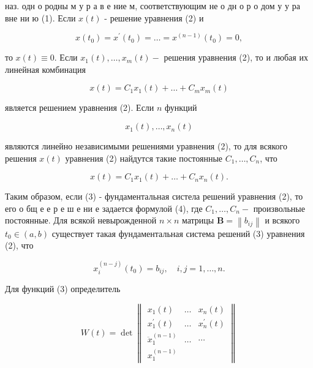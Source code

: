 \documentclass[10pt]{article}
\begin{document}
наз. одн о родны м у р а в е ние м, соответствующим не о дн о р о дом у у ра вне ни ю (1). Если $x(t)$ - решение уравнения (2) и



\[

x\left(t_{0}\right)=x^{\prime}\left(t_{0}\right)=\ldots=x^{(n-1)}\left(t_{0}\right)=0,

\]



то $x(t) \equiv 0$. Если $x_{1}(t), \ldots, x_{m}(t)-$ решения уравнения (2), то и любая их линейная комбинация



\[

x(t)=C_{1} x_{1}(t)+\ldots+C_{m} x_{m}(t)

\]



является решением уравнения (2). Если $n$ функций



\[

x_{1}(t), \ldots, x_{n}(t)

\]



являются линейно независимыми решениями уравнения (2), то для всякого решения $x(t)$ уравнения (2) найдутся такие постоянные $C_{1}, \ldots, C_{n}$, что



\[

x(t)=C_{1} x_{1}(t)+\ldots+C_{n} x_{n}(t) .

\]



Таким образом, если (3) - фундаментальная систела решений уравнения (2), то его о бщ е е р е ш е ни е задается формулой (4), где $C_{1}, \ldots, C_{n}-$ произвольные постоянные. Для всякой невырожденной $n \times n$ матрицы $\boldsymbol{B}=\left\|b_{i j}\right\|$ и всякого $t_{0} \in(a, b)$ существует такая фундаментальная система решений (3) уравнения (2), что



\[

x_{i}^{(n-j)}\left(t_{0}\right)=b_{i j}, \quad i, j=1, \ldots, n .

\]



Для функций (3) определитель



\[

W(t)=\operatorname{det}\left\|\begin{array}{lll}

x_{1}(t) & \ldots & x_{n}(t) \\

x_{1}^{\prime}(t) & \ldots & x_{n}^{\prime}(t) \\

\ddot{x}_{1}^{(n-1)} & \ldots & \cdots \\

x_{1}^{(n-1)}

\end{array}\right\|

\]
\end{document}
